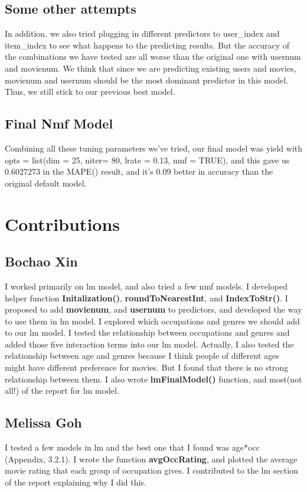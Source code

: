 \documentclass[11pt]{article}
\newcommand\tab[1][0.5cm]{\hspace*{#1}}
\begin{document}
\subsection{Some other attempts}
\tab{}In addition, we also tried plugging in different predictors to user\_index and item\_index to see what happens to the predicting results. But the accuracy of the combinations we have tested are all worse than the original one with usernum and movienum. We think that since we are predicting existing users and movies, movienum and usernum should be the most dominant predictor in this model. Thus, we still stick to our previous best model.

\subsection{Final Nmf Model}
\tab{}Combining all these tuning parameters we've tried, our final model was yield with opts = list(dim = 25, niter= 80, lrate = 0.13, nmf = TRUE), and this gave us 0.6027273 in the MAPE() result, and it's 0.09 better in accuracy than the original default model.


\section{Contributions}
\subsection{Bochao Xin}
I worked primarily on lm model, and also tried a few nmf models. I 
developed helper function \textbf{Initalization()}, 
\textbf{roundToNearestInt}, and \textbf{IndexToStr()}. I proposed 
to add \textbf{movienum}, and \textbf{usernum} to predictors, and 
developed the way to use them in lm model. I explored which 
occupations and genres we should add to our lm model. I tested the 
relationship between occupations and genres and added those five 
interaction terms into our lm model. Actually, I also tested the 
relationship between age and genres because I think people of 
different ages might have different preference for movies. But I
found that there is no strong relationship between them.
I also wrote \textbf{lmFinalModel()} function, and most(not all!) of the report for lm model.

\subsection{Melissa Goh}
I tested a few models in lm and the best one that I found was 
age*occ (Appendix, 3.2.1). I wrote the function \textbf{avgOccRating},
and plotted the average movie rating that each group of occupation gives.
I contributed to the lm section of the report explaining why I did this.
\end{document}
